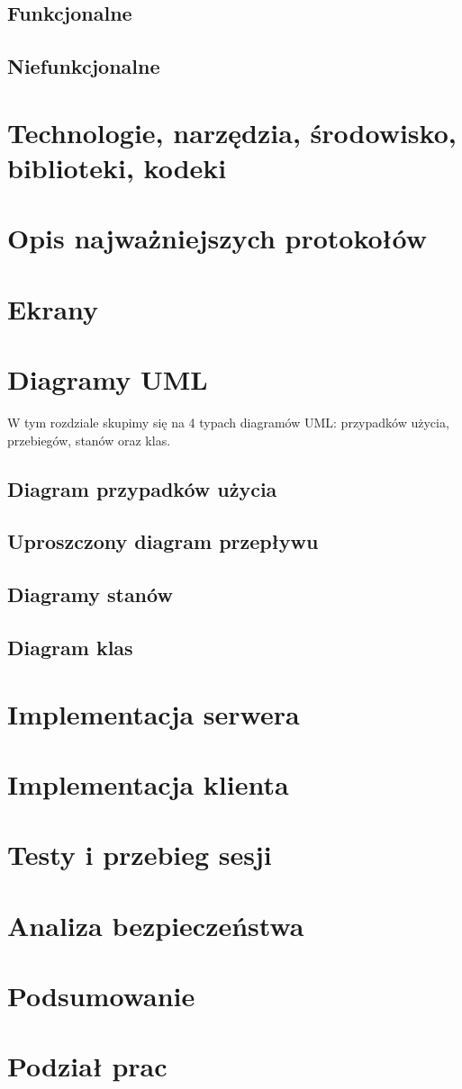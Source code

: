 \documentclass{article}
\begin{document}
	\subsection{Funkcjonalne}
	
	\subsection{Niefunkcjonalne}
	
	\section{Technologie, narzędzia, środowisko, biblioteki, kodeki}
	
	\section{Opis najważniejszych protokołów}
	
	\section{Ekrany}
	

	\section{Diagramy UML}
	{W tym rozdziale skupimy się na 4 typach diagramów UML: przypadków użycia, przebiegów, stanów oraz klas.}
	\subsection{Diagram przypadków użycia}
	
	\subsection{Uproszczony diagram przepływu}
	
	\subsection{Diagramy stanów}
	
	\subsection{Diagram klas}
	
	\section{Implementacja serwera}
	
	\section{Implementacja klienta}
	
	\section{Testy i przebieg sesji}
	
	\section{Analiza bezpieczeństwa}
	
	\section{Podsumowanie}
	
	\section{Podział prac}
	
\end{document}
